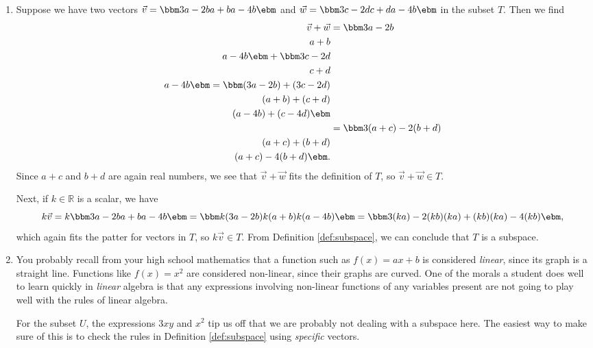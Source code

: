 {\begin{enumerate}
\item Suppose we have two vectors $\vec v = \bbm 3a-2b\\a+b\\a-4b\ebm$ and $\vec w = \bbm 3c-2d\\c+d\\a-4b\ebm$ in the subset $T$. Then we find
\begin{align*}
\vec v + \vec w &= \bbm 3a-2b\\a+b\\a-4b\ebm + \bbm 3c-2d\\c+d\\a-4b\ebm = \bbm (3a-2b)+(3c-2d)\\(a+b)+(c+d)\\(a-4b)+(c-4d)\ebm\\
& = \bbm 3(a+c)-2(b+d)\\(a+c)+(b+d)\\(a+c)-4(b+d)\ebm.
\end{align*}
Since $a+c$ and $b+d$ are again real numbers, we see that $\vec v+\vec w$ fits the definition of $T$, so $\vec v+\vec w\in T$.

Next, if $k\in \mathbb{R}$ is a scalar, we have
\[
k\vec v = k\bbm 3a-2b\\a+b\\a-4b\ebm = \bbm k(3a-2b)\\k(a+b)\\k(a-4b)\ebm = \bbm 3(ka)-2(kb)\\(ka)+(kb)\\(ka)-4(kb)\ebm,
\]
which again fits the patter for vectors in $T$, so $k\vec v\in T$. From Definition \ref{def:subspace}, we can conclude that $T$ is a subspace.

\item You probably recall from your high school mathematics that a function such as $f(x)=ax+b$ is considered \textit{linear}, since its graph is a straight line. Functions like $f(x)=x^2$ are considered non-linear, since their graphs are curved. One of the morals a student does well to learn quickly in \textit{linear} algebra is that any expressions involving non-linear functions of any variables present are not going to play well with the rules of linear algebra.

For the subset $U$, the expressions $3xy$ and $x^2$ tip us off that we are probably not dealing with a subspace here. The easiest way to make sure of this is to check the rules in Definition \ref{def:subspace} using \textit{specific} vectors.


\end{enumerate}}
